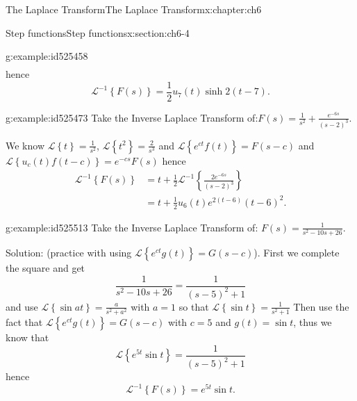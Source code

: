 \documentclass[oneside,10pt,]{book}
\numberwithin{equation}{section}
\numberwithin{equation}{section}
\newcommand{\amp}{&}
\begin{document}
\begin{chapterptx}{The Laplace Transform}{}{The Laplace Transform}{}{}{x:chapter:ch6}
\begin{sectionptx}{Step functions}{}{Step functions}{}{}{x:section:ch6-4}
\begin{example}{}{g:example:id525458}
\begin{align*}
\end{align*}
hence%
\begin{equation*}
\mathcal{L}^{-1}\left\{ F(s)\right\} =\frac{1}{2}u_{7}(t)\sinh2\left(t-7\right).
\end{equation*}
%
\end{example}
\begin{example}{}{g:example:id525473}%
Take the Inverse Laplace Transform of:\({\displaystyle F(s)=\frac{1}{s^{2}}+\frac{e^{-6s}}{\left(s-2\right)^{3}}}\).%
\par
We know \(\mathcal{L}\left\{ t\right\} =\frac{1}{s^{2}}\), \(\mathcal{L}\left\{ t^{2}\right\} =\frac{2}{s^{3}}\) and \(\mathcal{L}\left\{ e^{ct}f\left(t\right)\right\} =F(s-c)\) and \(\mathcal{L}\left\{ u_{c}(t)f\left(t-c\right)\right\} =e^{-cs}F(s)\) hence%
\begin{align*}
\mathcal{L}^{-1}\left\{ F(s)\right\}  \amp =t+\frac{1}{2}\mathcal{L}^{-1}\left\{ \frac{2e^{-6s}}{\left(s-2\right)^{3}}\right\} \\
\amp =t+\frac{1}{2}u_{6}(t)e^{2(t-6)}(t-6)^{2}.
\end{align*}
%
\end{example}
\begin{example}{}{g:example:id525513}%
Take the Inverse Laplace Transform of: \({\displaystyle F(s)=\frac{1}{s^{2}-10s+26}}\).%
\par
Solution: (practice with using \(\mathcal{L}\left\{ e^{ct}g\left(t\right)\right\} =G(s-c)\)). First we complete the square and get%
\begin{equation*}
\frac{1}{s^{2}-10s+26}=\frac{1}{\left(s-5\right)^{2}+1}
\end{equation*}
and use \(\mathcal{L}\left\{ \sin at\right\} =\frac{a}{s^{2}+a^{2}}\) with \(a=1\) so that \(\mathcal{L}\left\{ \sin t\right\} =\frac{1}{s^{2}+1}\) Then use the fact that \(\mathcal{L}\left\{ e^{ct}g\left(t\right)\right\} =G(s-c)\) with \(c=5\) and \(g(t)=\sin t\), thus we know that%
\begin{equation*}
\mathcal{L}\left\{ e^{5t}\sin t\right\} =\frac{1}{\left(s-5\right)^{2}+1}
\end{equation*}
hence%
\begin{equation*}
\mathcal{L}^{-1}\left\{ F(s)\right\} =e^{5t}\sin t.
\end{equation*}
%
\end{example}
\end{sectionptx}
%
%
\typeout{************************************************}
\typeout{************************************************}

\end{chapterptx}
\end{document}
